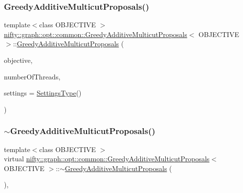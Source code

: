 \subsubsection{\texorpdfstring{Greedy\+Additive\+Multicut\+Proposals()}{GreedyAdditiveMulticutProposals()}}
{\footnotesize\ttfamily template$<$class O\+B\+J\+E\+C\+T\+I\+VE $>$ \\
\hyperlink{classnifty_1_1graph_1_1opt_1_1common_1_1GreedyAdditiveMulticutProposals}{nifty\+::graph\+::opt\+::common\+::\+Greedy\+Additive\+Multicut\+Proposals}$<$ O\+B\+J\+E\+C\+T\+I\+VE $>$\+::\hyperlink{classnifty_1_1graph_1_1opt_1_1common_1_1GreedyAdditiveMulticutProposals}{Greedy\+Additive\+Multicut\+Proposals} (\begin{DoxyParamCaption}\item[{const \hyperlink{classnifty_1_1graph_1_1opt_1_1common_1_1GreedyAdditiveMulticutProposals_a3e3e6166f8860e862acf00a9d134af54}{Objective\+Type} \&}]{objective,  }\item[{const size\+\_\+t}]{number\+Of\+Threads,  }\item[{const \hyperlink{structnifty_1_1graph_1_1opt_1_1common_1_1GreedyAdditiveMulticutProposals_1_1SettingsType}{Settings\+Type} \&}]{settings = {\ttfamily \hyperlink{structnifty_1_1graph_1_1opt_1_1common_1_1GreedyAdditiveMulticutProposals_1_1SettingsType}{Settings\+Type}()} }\end{DoxyParamCaption})\hspace{0.3cm}{\ttfamily [inline]}}

\mbox{\label{classnifty_1_1graph_1_1opt_1_1common_1_1GreedyAdditiveMulticutProposals_ab6333904198780a44ac75fc37a6ae49a}} 
\subsubsection{\texorpdfstring{$\sim$\+Greedy\+Additive\+Multicut\+Proposals()}{~GreedyAdditiveMulticutProposals()}}
{\footnotesize\ttfamily template$<$class O\+B\+J\+E\+C\+T\+I\+VE $>$ \\
virtual \hyperlink{classnifty_1_1graph_1_1opt_1_1common_1_1GreedyAdditiveMulticutProposals}{nifty\+::graph\+::opt\+::common\+::\+Greedy\+Additive\+Multicut\+Proposals}$<$ O\+B\+J\+E\+C\+T\+I\+VE $>$\+::$\sim$\hyperlink{classnifty_1_1graph_1_1opt_1_1common_1_1GreedyAdditiveMulticutProposals}{Greedy\+Additive\+Multicut\+Proposals} (\begin{DoxyParamCaption}{ }\end{DoxyParamCaption})\hspace{0.3cm}{\ttfamily [inline]}, {\ttfamily [virtual]}}



